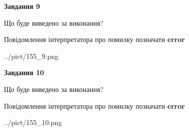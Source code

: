 \documentclass[12pt, ukrainian]{article}
\begin{document}
{{\begin {center}\textbf{Завдання 9}\end {center}}\par
Що буде виведено за виконання? \par
Повідомлення інтерпретатора про помилку позначати \textbf{error}

\begin{center}
	{../pict/155_9.png}
\end{center}
\newpage

{\begin {center}\textbf{Завдання 10}\end {center}}\par
Що буде виведено за виконання? \par
Повідомлення інтерпретатора про помилку позначати \textbf{error}

\begin{center}
	{../pict/155_10.png}
\end{center}
\newpage

}
\end{document}
